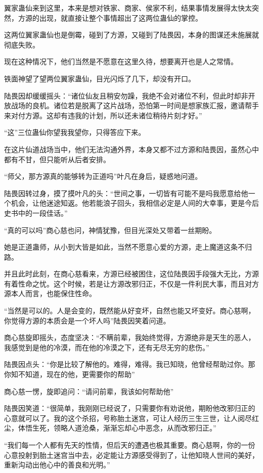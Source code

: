 \begin{this_body}
翼家蛊仙来到这里，本来是想对铁家、商家、侯家不利，结果事情发展得太快太突然，方源的出现，就直接让整个事情超出了这两位蛊仙的掌控。

这两位翼家蛊仙也是倒霉，碰到了方源，又碰到了陆畏因，本身的图谋还未施展就彻底失败。

现在这种情况下，他们当然是不愿意在这里久待，想要离开也是人之常情。

铁面神望了望两位翼家蛊仙，目光闪烁了几下，却没有开口。

陆畏因却缓缓摇头：“诸位仙友且稍安勿躁，我绝不会对诸位不利，但此时却非开放战场的良机。诸位若是脱离了这片战场，恐怕第一时间是想家族汇报，邀请帮手来对付方源。这却有违我的计划，所以还未诸位稍待片刻才好。”

“这”三位蛊仙你望我我望你，只得答应下来。

在这片仙道战场当中，他们无法沟通外界，本身又都不过方源和陆畏因，虽然心中都有不甘，但只能听从后者安排。

“师父，那方源真的能够转为正道吗”叶凡在身后，疑惑地问道。

陆畏因转过身，摸了摸叶凡的头：“世间之事，一切皆有可能不是吗我愿意给他一个机会，让他迷途知返。他若能浪子回头，我相信必定是人间的大幸事，更是今后史书中的一段佳话。”

“真的可以吗”商心慈也问，神情犹豫，但目光深处又带着一丝期盼。

她是正道蛊师，从小到大皆是如此，当然不愿意心爱的方源，走上魔道这条不归路。

并且此时此刻，在商心慈看来，方源已经被困住，这位陆畏因手段强大无比，方源有着性命之忧。这个时候，若是让方源改邪归正，不仅是一件利民大事，而且对方源本人而言，也能保住性命。

“当然是可以的。人是会变的，既然能从好变坏，自然也能又坏变好。商心慈啊，你觉得方源的本质会是一个坏人吗”陆畏因笑着问道。

商心慈旋即摇头，态度坚决：“不瞒前辈，我始终觉得，方源绝非是天生的恶人，我感觉到是他的冷漠，而在他的冷漠之下，还有无尽无穷的悲伤。”

陆畏因点头：“你是比较了解他的。难得，难得。我已知晓，他曾经帮助过你。那你知不知道，现在的他，更需要你的帮助”

商心慈一愣，旋即追问：“请问前辈，我该如何帮助他”

陆畏因笑道：“很简单，我刚刚已经说了，只需要你有劝说他，期盼他改邪归正的心意就可以了。我的这个杀招，号称胎土迷宫，可让人经历三生三世，让人阅尽红尘，体悟生死，领略人道沧桑，渐渐忘却心中恶念，从而改邪归正。”

“我们每一个人都有先天的性情，但后天的遭遇也极其重要。商心慈啊，你的一份心意投射到胎土迷宫当中去，必定能让方源感受得到了，让他知晓人世间的美好，重新沟动出他心中的善良和光明。”


\end{this_body}
